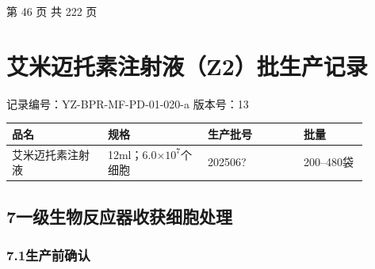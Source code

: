 \documentclass[UTF8,10pt,a4paper,fontset=fandol]{ctexart}
\newcommand{\fieldvalue}[1]{#1}
\newcommand{\handwritten}[1]{#1}
\begin{document}
\begin{center}
第 46 页 共 222 页
\end{center}

\newpage

\section{艾米迈托素注射液（Z2）批生产记录}

\noindent
记录编号：YZ-BPR-MF-PD-01-020-a\hfill
版本号：13

\begin{center}
\begin{tabular}{|p{0.24\linewidth}|p{0.25\linewidth}|p{0.24\linewidth}|p{0.16\linewidth}|}
\hline
品名 & 规格 & 生产批号 & 批量 \\
\hline
艾米迈托素注射液 & 12ml；6.0$\times 10^{7}$个细胞 &
\fieldvalue{\handwritten{202506?}} &
200--480袋 \\
\hline
\end{tabular}
\end{center}

\subsection{7\quad 一级生物反应器收获细胞处理}

\subsubsection{7.1\quad 生产前确认}
\end{document}
